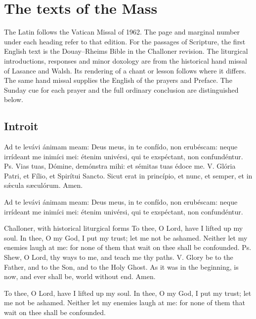 \section{The texts of the Mass}
The Latin follows the Vatican Missal of 1962. The page and marginal number under each heading refer to that edition. For the passages of Scripture, the first English text is the Douay--Rheims Bible in the Challoner revision. The liturgical introductions, responses and minor doxology are from the historical hand missal of Lasance and Walsh. Its rendering of a chant or lesson follows where it differs. The same hand missal supplies the English of the prayers and Preface. The Sunday cue for each prayer and the full ordinary conclusion are distinguished below.

\subsection{Introit}
\label{proper-introit}

\begin{latinproper}
Ad te levávi ánimam meam: Deus meus, in te confído, non erubéscam: neque irrídeant me inimíci mei: étenim univérsi, qui te exspéctant, non confundéntur. Ps. Vias tuas, Dómine, demónstra mihi: et sémitas tuas édoce me. V. Glória Patri, et Fílio, et Spirítui Sancto. Sicut erat in princípio, et nunc, et semper, et in sǽcula sæculórum. Amen.

Ad te levávi ánimam meam: Deus meus, in te confído, non erubéscam: neque irrídeant me inimíci mei: étenim univérsi, qui te exspéctant, non confundéntur.
\end{latinproper}

\begin{englishwitness}{Challoner, with historical liturgical forms}
To thee, O Lord, have I lifted up my soul. In thee, O my God, I put my trust; let me not be ashamed. Neither let my enemies laugh at me: for none of them that wait on thee shall be confounded. Ps. Shew, O Lord, thy ways to me, and teach me thy paths. V. Glory be to the Father, and to the Son, and to the Holy Ghost. As it was in the beginning, is now, and ever shall be, world without end. Amen.

To thee, O Lord, have I lifted up my soul. In thee, O my God, I put my trust; let me not be ashamed. Neither let my enemies laugh at me: for none of them that wait on thee shall be confounded.
\end{englishwitness}


